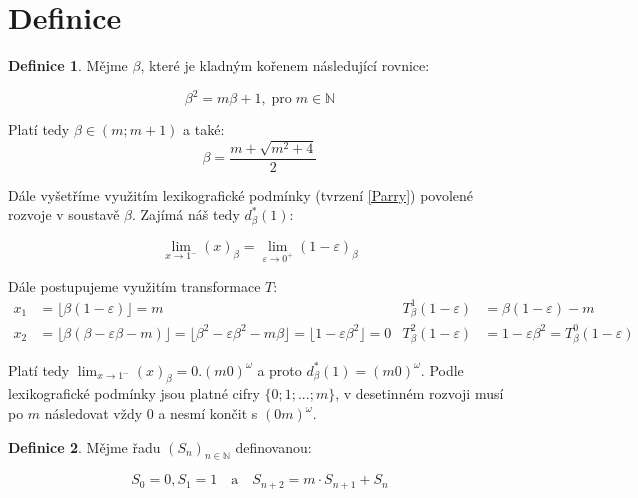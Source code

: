 \documentclass{article}
\theoremstyle{definition}
\theoremstyle{definition}
\newtheorem{definice}{Definice}[section]
\theoremstyle{remark}
\numberwithin{equation}{section}
\begin{document}
\section{Definice}
\begin{definice}

	Mějme $\beta$, které je kladným kořenem následující rovnice:

	\begin{equation} \label{eq:1}
		\beta^2 = m \beta + 1, \; \text{pro} \; m \in \mathbb{N}
	\end{equation}

	Platí tedy $\beta \in (m; m + 1)$ a také:
	\[
		\beta = \frac{m + \sqrt{m^2 + 4}}{2}
	\]
\end{definice}

Dále vyšetříme využitím lexikografické podmínky (tvrzení \ref{Parry}) povolené rozvoje v soustavě $\beta$. Zajímá náš tedy $d^\ast_\beta(1)$:

\[
	\lim_{x \to 1^-} (x)_\beta = \lim_{\varepsilon \to 0^+} (1 - \varepsilon)_\beta
\]

Dále postupujeme využitím transformace $T$:
\begin{align*}
	x_1 & = \lfloor \beta (1 - \varepsilon) \rfloor = m                                                                                                                    & T^1_\beta(1 - \varepsilon) & = \beta(1 - \varepsilon) - m                           \\
	x_2 & = \lfloor \beta (\beta - \varepsilon \beta - m) \rfloor = \lfloor \beta^2 - \varepsilon \beta^2 - m \beta \rfloor =  \lfloor 1 - \varepsilon \beta^2 \rfloor = 0 & T^2_\beta(1 - \varepsilon) & = 1 - \varepsilon \beta^2 = T^0_\beta(1 - \varepsilon)
\end{align*}

Platí tedy $\lim_{x \to 1^-} (x)_\beta = 0.(m0)^\omega$ a proto $d^*_\beta(1) = (m0)^\omega$. Podle lexikografické podmínky jsou platné cifry $\{0; 1; ...; m\}$, v desetinném rozvoji musí po $m$ následovat vždy $0$ a nesmí končit s $(0m)^\omega$.

\begin{definice}
	Mějme řadu $(S_n)_{n \in \mathbb{N}}$ definovanou:

	\begin{equation} \label{eq:2}
		S_0 = 0, S_1 = 1 \quad \text{a} \quad S_{n + 2} = m \cdot S_{n + 1} + S_n
	\end{equation}
\end{definice}
\end{document}
